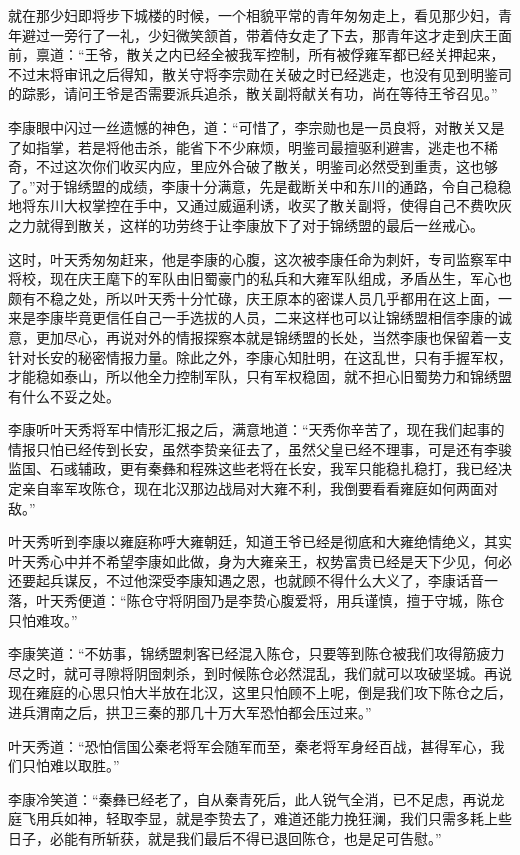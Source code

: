 就在那少妇即将步下城楼的时候，一个相貌平常的青年匆匆走上，看见那少妇，青年避过一旁行了一礼，少妇微笑颔首，带着侍女走了下去，那青年这才走到庆王面前，禀道：“王爷，散关之内已经全被我军控制，所有被俘雍军都已经关押起来，不过末将审讯之后得知，散关守将李宗勋在关破之时已经逃走，也没有见到明鉴司的踪影，请问王爷是否需要派兵追杀，散关副将献关有功，尚在等待王爷召见。”

李康眼中闪过一丝遗憾的神色，道：“可惜了，李宗勋也是一员良将，对散关又是了如指掌，若是将他击杀，能省下不少麻烦，明鉴司最擅驱利避害，逃走也不稀奇，不过这次你们收买内应，里应外合破了散关，明鉴司必然受到重责，这也够了。”对于锦绣盟的成绩，李康十分满意，先是截断关中和东川的通路，令自己稳稳地将东川大权掌控在手中，又通过威逼利诱，收买了散关副将，使得自己不费吹灰之力就得到散关，这样的功劳终于让李康放下了对于锦绣盟的最后一丝戒心。

这时，叶天秀匆匆赶来，他是李康的心腹，这次被李康任命为刺奸，专司监察军中将校，现在庆王麾下的军队由旧蜀豪门的私兵和大雍军队组成，矛盾丛生，军心也颇有不稳之处，所以叶天秀十分忙碌，庆王原本的密谍人员几乎都用在这上面，一来是李康毕竟更信任自己一手选拔的人员，二来这样也可以让锦绣盟相信李康的诚意，更加尽心，再说对外的情报探察本就是锦绣盟的长处，当然李康也保留着一支针对长安的秘密情报力量。除此之外，李康心知肚明，在这乱世，只有手握军权，才能稳如泰山，所以他全力控制军队，只有军权稳固，就不担心旧蜀势力和锦绣盟有什么不妥之处。

李康听叶天秀将军中情形汇报之后，满意地道：“天秀你辛苦了，现在我们起事的情报只怕已经传到长安，虽然李贽亲征去了，虽然父皇已经不理事，可是还有李骏监国、石彧辅政，更有秦彝和程殊这些老将在长安，我军只能稳扎稳打，我已经决定亲自率军攻陈仓，现在北汉那边战局对大雍不利，我倒要看看雍庭如何两面对敌。”

叶天秀听到李康以雍庭称呼大雍朝廷，知道王爷已经是彻底和大雍绝情绝义，其实叶天秀心中并不希望李康如此做，身为大雍亲王，权势富贵已经是天下少见，何必还要起兵谋反，不过他深受李康知遇之恩，也就顾不得什么大义了，李康话音一落，叶天秀便道：“陈仓守将阴囹乃是李贽心腹爱将，用兵谨慎，擅于守城，陈仓只怕难攻。”

李康笑道：“不妨事，锦绣盟刺客已经混入陈仓，只要等到陈仓被我们攻得筋疲力尽之时，就可寻隙将阴囹刺杀，到时候陈仓必然混乱，我们就可以攻破坚城。再说现在雍庭的心思只怕大半放在北汉，这里只怕顾不上呢，倒是我们攻下陈仓之后，进兵渭南之后，拱卫三秦的那几十万大军恐怕都会压过来。”

叶天秀道：“恐怕信国公秦老将军会随军而至，秦老将军身经百战，甚得军心，我们只怕难以取胜。”

李康冷笑道：“秦彝已经老了，自从秦青死后，此人锐气全消，已不足虑，再说龙庭飞用兵如神，轻取李显，就是李贽去了，难道还能力挽狂澜，我们只需多耗上些日子，必能有所斩获，就是我们最后不得已退回陈仓，也是足可告慰。”

